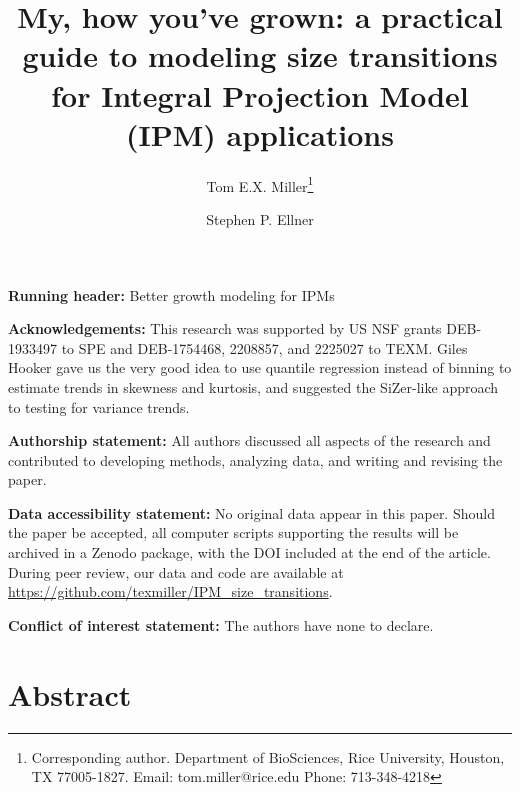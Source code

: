 \documentclass[12pt]{article}
\title{My, how you've grown: a practical guide to modeling size transitions for Integral Projection Model (IPM) applications}
\author[a]{Tom E.X. Miller\thanks{Corresponding author. Department of BioSciences, Rice University,
Houston, TX 77005-1827. Email: tom.miller@rice.edu Phone: 713-348-4218}}
\author[b]{Stephen P. Ellner}
\affil[a]{Department of BioSciences, Rice University, Houston TX }
\affil[b]{Department of Ecology \& Evolutionary Biology, Cornell University, Ithaca NY}
\date{}
\begin{document}
\renewcommand{\baselinestretch}{1.2} 
\maketitle

\bigskip 
\noindent\textbf{Running header:} Better growth modeling for IPMs

\bigskip 
\noindent\textbf{Acknowledgements:} This research was supported by US NSF grants DEB-1933497 to SPE and DEB-1754468, 2208857, and 2225027 to TEXM. Giles Hooker gave us the very good idea to use 
quantile regression instead of binning to estimate trends in skewness and kurtosis, and suggested the SiZer-like approach to testing for variance trends. 

\bigskip 
\noindent\textbf{Authorship statement:} All authors discussed all aspects of the research and contributed to developing methods, analyzing data, and writing and revising the paper.  

\bigskip 
\noindent\textbf{Data accessibility statement:} No original data appear in this paper. Should the paper be accepted, all computer scripts supporting the results will be archived in a Zenodo package, with the DOI included at the end of the article. During peer review, our data and code are available at \url{https://github.com/texmiller/IPM_size_transitions}. 

\bigskip 
\noindent\textbf{Conflict of interest statement:} The authors have none to declare. 

\newpage
\linenumbers
\section*{Abstract} 
\end{document}
